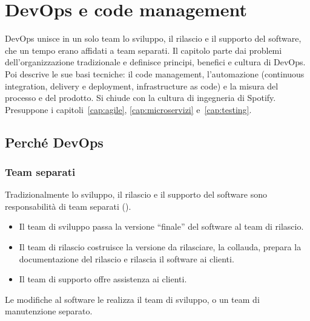\chapter{DevOps e code management}
\label{cap:devops}

\begin{inbreve}
DevOps unisce in un solo team lo sviluppo, il rilascio e il supporto del software, che un tempo erano affidati a team
separati. Il capitolo parte dai problemi dell'organizzazione tradizionale e definisce principi, benefici e cultura di
DevOps. Poi descrive le sue basi tecniche: il code management, l'automazione (continuous integration, delivery e
deployment, infrastructure as code) e la misura del processo e del prodotto. Si chiude con la cultura di ingegneria di
Spotify. Presuppone i capitoli~\ref{cap:agile}, \ref{cap:microservizi} e~\ref{cap:testing}.
\end{inbreve}

\section{Perché DevOps}
\label{sec:devops-perche}

\subsection{Team separati}

Tradizionalmente lo sviluppo, il rilascio e il supporto del software sono responsabilità di team separati
().
\begin{itemize}
  \item Il team di sviluppo passa la versione ``finale'' del software al team di rilascio.
  \item Il team di rilascio costruisce la versione da rilasciare, la collauda, prepara la documentazione del rilascio e
    rilascia il software ai clienti.
  \item Il team di supporto offre assistenza ai clienti.
\end{itemize}
Le modifiche al software le realizza il team di sviluppo, o un team di manutenzione separato.

